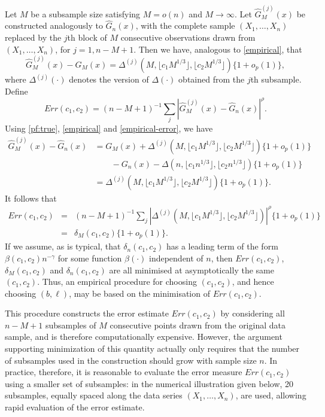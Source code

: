 \documentclass[a4paper, 12pt]{article}
\theoremstyle{plain}
\theoremstyle{definition}
\begin{document}
Let $M$ be a subsample size satisfying $M=o(n)$ and $M \rightarrow \infty$. Let $\hat{G}_{M}^{(j)}(x)$ be constructed analogously to $\hat{G}_{n}(x)$, with the complete sample $(X_{1}, \ldots, X_{n})$ replaced by the $j$th block of $M$ consecutive observations drawn from $(X_{1}, \ldots, X_{n})$, for $j=1, n-M+1$. Then we have, analogous to \eqref{empirical}, that
\begin{equation} \label{empirical-error}
\hat{G}_{M}^{(j)}(x)-G_{M}(x)=\Delta^{(j)}\left(M, \lfloor c_{1}M^{1/3} \rfloor, \lfloor c_{2}M^{1/3} \rfloor \right)\{1+o_{p}(1)\},
\end{equation}
where $\Delta^{(j)}(\cdot)$ denotes the version of $\Delta(\cdot)$ obtained from the $j$th subsample. Define
\begin{equation*}
Err(c_{1},c_{2})=(n-M+1)^{-1}\sum_{j}\left|\hat{G}_{M}^{(j)}(x)-\hat{G}_{n}(x)\right|^{\rho}.
\end{equation*}
Using \eqref{pf:true}, \eqref{empirical} and \eqref{empirical-error}, we have
\begin{align*}
\hat{G}_{M}^{(j)}(x)-\hat{G}_{n}(x) &= G_{M}(x)+\Delta^{(j)}\left(M,\lfloor c_{1}M^{1/3} \rfloor , \lfloor c_{2}M^{1/3} \rfloor \right)\{1+o_{p}(1)\} \\
& \qquad - G_{n}(x)-\Delta\left(n, \lfloor c_{1}n^{1/3} \rfloor , \lfloor c_{2}n^{1/3} \rfloor \right)\{1+o_{p}(1)\} \\
&= \Delta^{(j)}\left(M, \lfloor c_{1}M^{1/3} \rfloor , \lfloor c_{2}M^{1/3} \rfloor \right)\{1+o_{p}(1)\} .
\end{align*}
It follows that
\begin{eqnarray*}
Err(c_{1},c_{2})&=&(n-M+1)^{-1}\sum_{j}\left|\Delta^{(j)}\left(M, \lfloor c_{1}M^{1/3} \rfloor , \lfloor c_{2}M^{1/3} \rfloor \right)\right|^{\rho}\{1+o_p(1)\} \\&=&\delta_{M}(c_{1},c_{2})\{1+o_p(1)\}.    
\end{eqnarray*}
If we assume, as is typical, that $\delta_{n}(c_{1},c_{2})$ has a leading term of the form $\beta(c_{1},c_{2})n^{-\gamma}$ for some function $\beta(\cdot)$ independent of $n$, then $Err(c_{1},c_{2})$, $\delta_{M}(c_{1},c_{2})$ and $\delta_{n}(c_{1},c_{2})$ are all minimised at asymptotically the same $(c_{1},c_{2})$. Thus, an empirical procedure for choosing $(c_{1},c_{2})$, and hence choosing $(b, \ell)$, may be based on the minimisation of $Err(c_{1},c_{2})$.

This procedure constructs the error estimate $Err(c_1,c_2)$ by considering all $n-M+1$ subsamples of $M$ consecutive points drawn from the original data sample, and is therefore computationally expensive. However, the argument supporting minimization of this quantity actually only requires that the number of subsamples used in the construction should grow with sample size $n$. In practice, therefore, it is reasonable to evaluate the error measure $Err(c_1,c_2)$ using a smaller set of subsamples: in the numerical illustration given below, 20 subsamples, equally spaced along the data series $(X_1, \ldots, X_n)$, are used, allowing rapid evaluation of the error estimate.
\end{document}
